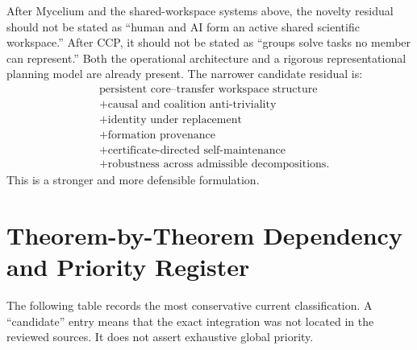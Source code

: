 After Mycelium and the shared-workspace systems above, the novelty residual
should not be stated as ``human and AI form an active shared scientific
workspace.'' After CCP, it should not be stated as ``groups solve tasks no
member can represent.'' Both the operational architecture and a rigorous
representational planning model are already present. The narrower candidate residual is:
\[
\boxed{
\begin{aligned}
&\text{persistent core--transfer workspace structure}\\
&+\text{causal and coalition anti-triviality}\\
&+\text{identity under replacement}\\
&+\text{formation provenance}\\
&+\text{certificate-directed self-maintenance}\\
&+\text{robustness across admissible decompositions}.
\end{aligned}
}
\]
This is a stronger and more defensible formulation.

\section{Theorem-by-Theorem Dependency and Priority Register}


The following table records the most conservative current classification. A
``candidate'' entry means that the exact integration was not located in the
reviewed sources. It does not assert exhaustive global priority.

